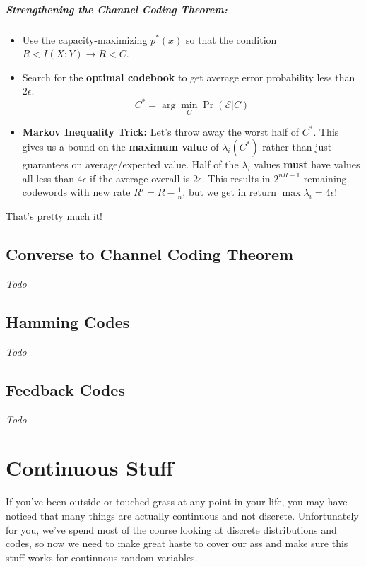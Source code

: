 \documentclass[a4paper,12pt]{report}
\begin{document}
\paragraph{Strengthening the Channel Coding Theorem: } 
\begin{itemize}
\item Use the capacity-maximizing $p^*(x)$ so that the condition $R < I(X; Y)
\to R< C$.

\item Search for the \textbf{optimal codebook} to get average error probability
less than $2\epsilon$.
	\begin{equation}
		C^* = \arg\min_C \Pr(\mathcal E | C)
	\end{equation}

\item \textbf{Markov Inequality Trick:} Let's throw away the worst half of
$C^*$. This gives us a bound on the \textbf{maximum value} of $\lambda_i(C^*)$
rather than just guarantees on average/expected value. Half of the $\lambda_i$
values \textbf{must} have values all less than $4\epsilon$ if the average
overall is $2\epsilon$. This results in $2^{nR-1}$ remaining codewords with new
rate $R' = R - \frac 1 n$, but we get in return $\max \lambda_i = 4\epsilon$!
\end{itemize}

That's pretty much it! 


\section{Converse to Channel Coding Theorem}
\textit{Todo} 

\section{Hamming Codes}
\textit{Todo} 

\section{Feedback Codes} 
\textit{Todo} 










\chapter{Continuous Stuff}

If you've been outside or touched grass at any point in your life, you may have
noticed that many things are actually continuous and not discrete. Unfortunately
for you, we've spend most of the course looking at discrete distributions and
codes, so now we need to make great haste to cover our ass and make sure this
stuff works for continuous random variables. 
\end{document}
